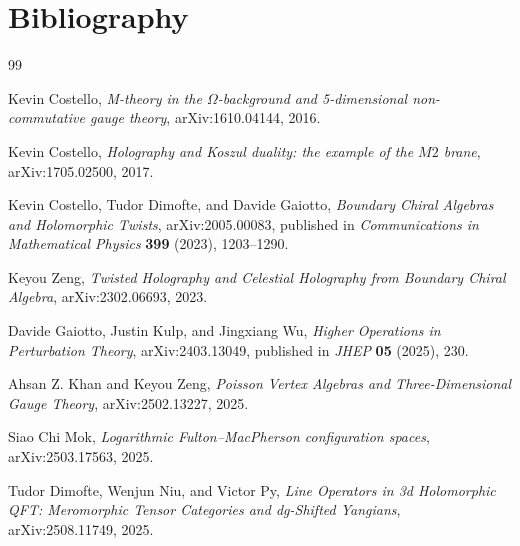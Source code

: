 \documentclass[11pt,oneside]{memoir}
\numberwithin{equation}{chapter}
\theoremstyle{definition}
\begin{document}
\chapter*{Bibliography}
\begin{thebibliography}{99}

Kevin Costello,
\emph{M-theory in the \(\Omega\)-background and 5-dimensional non-commutative gauge theory},
arXiv:1610.04144, 2016.

Kevin Costello,
\emph{Holography and Koszul duality: the example of the \(M2\) brane},
arXiv:1705.02500, 2017.

Kevin Costello, Tudor Dimofte, and Davide Gaiotto,
\emph{Boundary Chiral Algebras and Holomorphic Twists},
arXiv:2005.00083, published in \emph{Communications in Mathematical Physics} \textbf{399} (2023), 1203--1290.

Keyou Zeng,
\emph{Twisted Holography and Celestial Holography from Boundary Chiral Algebra},
arXiv:2302.06693, 2023.

Davide Gaiotto, Justin Kulp, and Jingxiang Wu,
\emph{Higher Operations in Perturbation Theory},
arXiv:2403.13049, published in \emph{JHEP} \textbf{05} (2025), 230.

Ahsan Z. Khan and Keyou Zeng,
\emph{Poisson Vertex Algebras and Three-Dimensional Gauge Theory},
arXiv:2502.13227, 2025.

Siao Chi Mok,
\emph{Logarithmic Fulton--MacPherson configuration spaces},
arXiv:2503.17563, 2025.

Tudor Dimofte, Wenjun Niu, and Victor Py,
\emph{Line Operators in 3d Holomorphic QFT: Meromorphic Tensor Categories and dg-Shifted Yangians},
arXiv:2508.11749, 2025.

\end{thebibliography}
\end{document}
